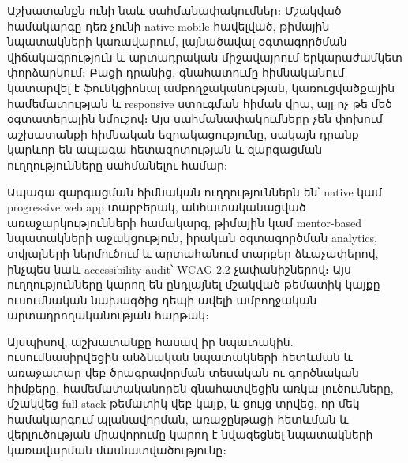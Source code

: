 Աշխատանքն ունի նաև սահմանափակումներ։ Մշակված համակարգը դեռ չունի native mobile հավելված, թիմային նպատակների կառավարում, լայնածավալ օգտագործման վիճակագրություն և արտադրական միջավայրում երկարաժամկետ փորձարկում։ Բացի դրանից, գնահատումը հիմնականում կատարվել է ֆունկցիոնալ ամբողջականության, կառուցվածքային համեմատության և responsive ստուգման հիման վրա, այլ ոչ թե մեծ օգտատերային նմուշով։ Այս սահմանափակումները չեն փոխում աշխատանքի հիմնական եզրակացությունը, սակայն դրանք կարևոր են ապագա հետազոտության և զարգացման ուղղությունները սահմանելու համար։

Ապագա զարգացման հիմնական ուղղություններն են՝ native կամ progressive web app տարբերակ, անհատականացված առաջարկությունների համակարգ, թիմային կամ mentor-based նպատակների աջակցություն, իրական օգտագործման analytics, տվյալների ներմուծում և արտահանում տարբեր ձևաչափերով, ինչպես նաև accessibility audit՝ WCAG 2.2 չափանիշներով։ Այս ուղղությունները կարող են ընդլայնել մշակված թեմատիկ կայքը ուսումնական նախագծից դեպի ավելի ամբողջական արտադրողականության հարթակ։

Այսպիսով, աշխատանքը հասավ իր նպատակին. ուսումնասիրվեցին անձնական նպատակների հետևման և առաջատար վեբ ծրագրավորման տեսական ու գործնական հիմքերը, համեմատականորեն գնահատվեցին առկա լուծումները, մշակվեց full-stack թեմատիկ վեբ կայք, և ցույց տրվեց, որ մեկ համակարգում պլանավորման, առաջընթացի հետևման և վերլուծության միավորումը կարող է նվազեցնել նպատակների կառավարման մասնատվածությունը։

\fussy
